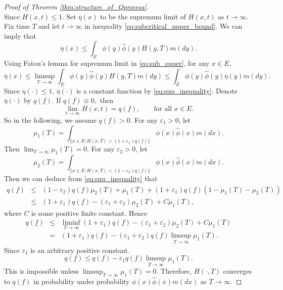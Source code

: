 \documentclass[12pt,a4paper]{amsart}
\numberwithin{equation}{section}
\theoremstyle{plain}
\theoremstyle{definition}
\begin{document}
\begin{proof}[Proof of Theorem \ref{thm:structure_of_Qprocess}]
\[  \]
  Since $H(x,t)\leq 1$.  Set $\overline \eta(x)$ to be the supremum limit of $H(x,t)$ as $t\to \infty$.
  Fix time $T$ and let $t\to \infty$ in inequality \eqref{eq:subcritical_upper_bound}. We can imply that
  \begin{equation}\label{eq:sub_super}
    \overline\eta(x)\leq \int_E\phi(y)\widehat \phi(y)H(y,T)m(dy).
  \end{equation}
  Using Fatou's lemma for supremum limit
  in \eqref{eq:sub_super}, for any $x\in E$,
  \begin{equation}\label{eq:sup_inequality}
    \overline\eta(x)\leq \limsup_{T\rightarrow\infty}\int_E\phi(y)\widehat \phi(y)H(y,T)m(dy)\leq \int_E\phi(y)\widehat\phi(y)\overline{\eta}(y)m(dy).
  \end{equation}
  Since $\overline{\eta}(\cdot)\leq 1$, $\overline\eta(\cdot)$ is a constant function by \eqref{eq:sup_inequality}.
  Denote $\overline\eta(\cdot)$ by $q(f)$.  If $q(f)\equiv 0,$ then
  \begin{equation}\label{eq:limit}
    \lim_{t\rightarrow\infty}H(x,t)=q(f),\qquad \mbox{for all}\,\, x\in E.
  \end{equation}
  So in the
  following, we assume $q(f)>0$.
  For any $\varepsilon_1>0$, let
  $$
  \mu_1(T)=\int_{\{x\in
    E;H(x,T)>(1+\varepsilon_1)q(f)\}}\phi(x)\widehat\phi(x)m(dx).
  $$
  Then $\lim_{T\rightarrow\infty}\mu_1(T)=0.$  For any $\varepsilon_2>0$, let
  $$
  \mu_2(T)=\int_{\{x\in
    E;H(x,T)<(1-\varepsilon_2)q(f)\}}\phi(x)\widehat\phi(x)m(dx).
  $$
  Then we can deduce from \eqref{eq:sup_inequality} that
  \begin{eqnarray}\label{eq:sub_limit_in_prob}
    q(f)&\leq&
               (1-\varepsilon_2)q(f)\mu_2(T)+\mu_1(T)+(1+\varepsilon_1)q(f)(1-\mu_1(T)-\mu_2(T))\\
        &\le
             &(1+\varepsilon_1)q(f)-(\varepsilon_1+\varepsilon_2)\mu_2(T)+C\mu_1(T),
  \end{eqnarray}
  where $C$ is some positive finite constant.  Hence
  \begin{eqnarray*}\label{eq:sublimt_inequality}
    q(f)&\leq&
               \liminf_{T\rightarrow\infty}(1+\varepsilon_1)q(f)-(\varepsilon_1+\varepsilon_2)\mu_2(T)+C\mu_1(T)\\
        &=&(1+\varepsilon_1)q(f)-(\varepsilon_1+\varepsilon_2)q(f)\limsup_{T\rightarrow\infty}\mu_1(T).
  \end{eqnarray*}
  Since $\varepsilon_1$ is an arbitrary positive constant.
  \[
    q(f)\leq q(f)-\varepsilon_1 q(f)\limsup_{T\rightarrow\infty}\mu_1(T).
  \]
  This is impossible unless $\limsup_{T\rightarrow\infty}\mu_1(T)=0.$
  Therefore, $H(\cdot,T)$ converges to $q(f)$ in probability under probability $\phi(x)\widehat{\phi}(x)m(dx)$ as $T\to\infty$.



\end{proof}
\end{document}
